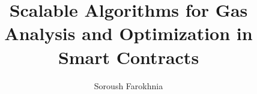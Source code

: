 \documentclass[a4paper, dvipsnames]{ustthesis}
\title{Scalable Algorithms for Gas Analysis and Optimization in Smart Contracts}  %
\author{Soroush Farokhnia}     %
\begin{document}
\maketitle

\singlespacing
\abstract

\endabstract
\doublespacing
\authorise

\onehalfspacing
\dedication

\enddedication
\newpage

\acknowledgments

\endacknowledgments
\newpage

\publications

\endpublications
\newpage

\singlespacing
\tableofcontents
\onehalfspacing






\end{document}
